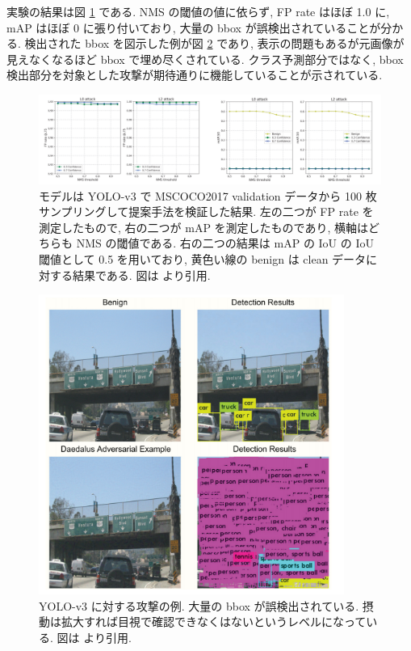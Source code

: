 実験の結果は図 \ref{fig:daedalus-result-fp-map} である.
NMS の閾値の値に依らず, FP rate はほぼ 1.0 に, mAP はほぼ 0 に張り付いており, 大量の bbox が誤検出されていることが分かる.
検出された bbox を図示した例が図 \ref{fig:daedalus-example} であり, 表示の問題もあるが元画像が見えなくなるほど bbox で埋め尽くされている.
クラス予測部分ではなく, bbox 検出部分を対象とした攻撃が期待通りに機能していることが示されている.
%
\begin{figure}[htbp]
\begin{center}
\includegraphics[width=16.0cm]{figures/daedalus-result-fp-map.pdf}
\end{center}
\caption{
モデルは YOLO-v3 で MSCOCO2017 validation データから 100 枚サンプリングして提案手法を検証した結果.
左の二つが FP rate を測定したもので, 右の二つが mAP を測定したものであり, 横軸はどちらも NMS の閾値である.
右の二つの結果は mAP の IoU の IoU 閾値として 0.5 を用いており, 黄色い線の benign は clean データに対する結果である.
図は \cite{wang2019daedalus} より引用.
}
\label{fig:daedalus-result-fp-map}
\end{figure}
%
%
\begin{figure}[htbp]
\begin{center}
\includegraphics[width=10.0cm]{figures/daedalus-example.pdf}
\end{center}
\caption{
YOLO-v3 に対する攻撃の例.
大量の bbox が誤検出されている.
摂動は拡大すれば目視で確認できなくはないというレベルになっている.
図は \cite{wang2019daedalus} より引用.
}
\label{fig:daedalus-example}
\end{figure}
%

